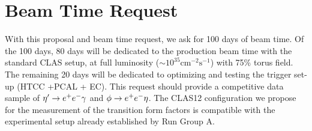 \section{Beam Time Request}\label{sec:beamrequest}
With this proposal and beam time request, we ask for 100 days of beam time. Of the 100 days, 80 days will be dedicated to the production beam time with the standard CLAS setup, at full luminosity ($\sim 10^{35} \mathrm{cm^{-2}s^{-1}}$) with 75\% torus field. The remaining 20 days will be dedicated to optimizing and testing the trigger set-up (HTCC +PCAL + EC). This request should provide a competitive data sample of $\eta^{\prime} \to e^+e^- \gamma$ and $\phi \to e^+e^- \eta$. The CLAS12 configuration we propose for the measurement of the transition form factors is compatible with the experimental setup already established by Run Group A.